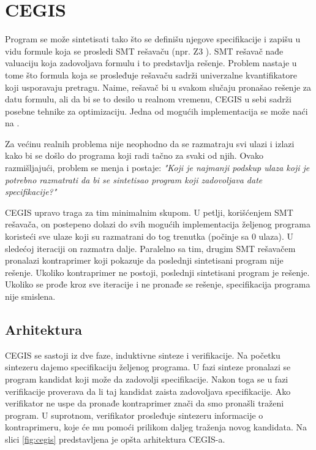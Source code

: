 \section{CEGIS}
\label{sec:cegis}

Program se može sintetisati tako što se definišu njegove specifikacije i zapišu u vidu formule koja se prosledi SMT rešavaču (npr. Z3 \cite{Z3}). SMT rešavač nađe valuaciju koja zadovoljava formulu i to predstavlja rešenje. Problem nastaje u tome što formula koja se prosleđuje rešavaču sadrži univerzalne kvantifikatore koji usporavaju pretragu. Naime, rešavač bi u svakom slučaju pronašao rešenje za datu formulu, ali da bi se to desilo u realnom vremenu, CEGIS u sebi sadrži posebne tehnike za optimizaciju. Jedna od mogućih implementacija se može naći na \cite{CEGISimpl}.

Za većinu realnih problema nije neophodno da se razmatraju svi ulazi i izlazi kako bi se došlo do programa koji radi tačno za svaki od njih. Ovako razmišljajući, problem se menja i postaje: \emph{"Koji je najmanji podskup ulaza koji je potrebno razmatrati da bi se sintetisao program koji zadovoljava date specifikacije?"}

CEGIS upravo traga za tim minimalnim skupom. U petlji, korišćenjem SMT rešavača, on postepeno dolazi do svih mogućih implementacija že\-lje\-nog programa koristeći sve ulaze koji su razmatrani do tog trenutka (počinje sa 0 ulaza). U sledećoj iteraciji on razmatra dalje. Paralelno sa tim, drugim SMT rešavačem pronalazi kontraprimer koji pokazuje da poslednji sintetisani program nije rešenje. Ukoliko kontraprimer ne postoji, poslednji sintetisani program je rešenje. Ukoliko se prođe kroz sve iteracije i ne pronađe se rešenje, specifikacija programa nije smislena.


\subsection{Arhitektura}
\label{subsec:Arhitektura}

CEGIS se sastoji iz dve faze, induktivne sinteze i verifikacije. Na početku sintezeru dajemo specifikaciju željenog programa. U fazi sinteze pronalazi se program kandidat koji može da zadovolji specifikacije. Nakon toga se u fazi verifikacije proverava da li taj kandidat zaista zadovoljava specifikacije. Ako verifikator ne uspe da pronađe kontraprimer znači da smo pronašli traženi program. U suprotnom, verifikator prosleđuje sintezeru informacije o kontraprimeru, koje će mu pomoći prilikom daljeg traženja novog kandidata. Na slici \ref{fig:cegis} predstavljena je opšta arhitektura CEGIS-a.

